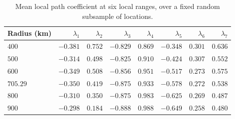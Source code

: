 \begin{table}[!ht]
\centering
\caption{Mean local path coefficient at six local ranges, over a fixed random subsample of locations.}
\label{tab:radius-sensitivity}
\begin{tabular}{lrrrrrrr}
\hline
Radius (km) & $\lambda_1$ & $\lambda_2$ & $\lambda_3$ & $\lambda_4$ & $\lambda_5$ & $\lambda_6$ & $\lambda_7$ \\
\hline
$400$ & $-0.381$ & $0.752$ & $-0.829$ & $0.869$ & $-0.348$ & $0.301$ & $0.636$ \\
$500$ & $-0.314$ & $0.498$ & $-0.825$ & $0.910$ & $-0.424$ & $0.307$ & $0.552$ \\
$600$ & $-0.349$ & $0.508$ & $-0.856$ & $0.951$ & $-0.517$ & $0.273$ & $0.575$ \\
$705.29$ & $-0.350$ & $0.419$ & $-0.875$ & $0.933$ & $-0.578$ & $0.272$ & $0.538$ \\
$800$ & $-0.310$ & $0.350$ & $-0.875$ & $0.983$ & $-0.625$ & $0.269$ & $0.487$ \\
$900$ & $-0.298$ & $0.184$ & $-0.888$ & $0.988$ & $-0.649$ & $0.258$ & $0.480$ \\
\hline
\end{tabular}
\end{table}

